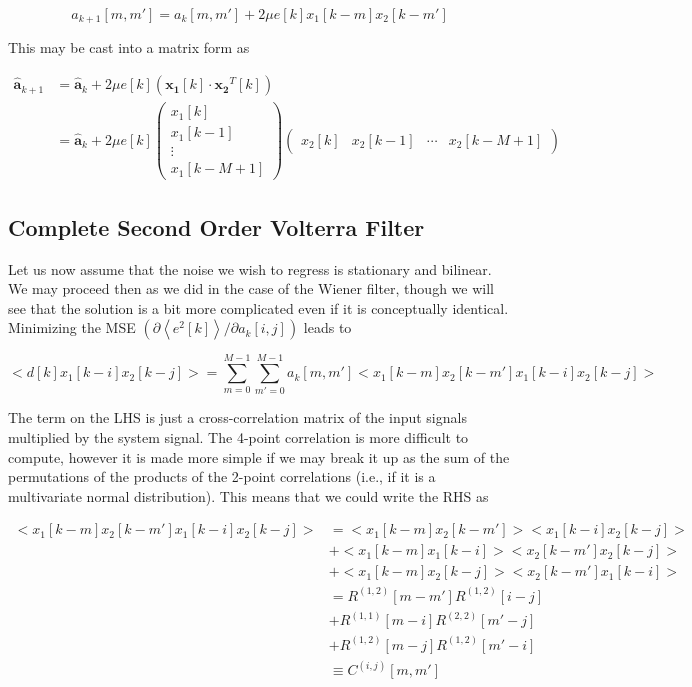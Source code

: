 \documentclass{article}
\begin{document}
\begin{equation}
     a_{k+1}[m, m'] = a_k[m, m'] + 2\mu e[k]
     x_1[k-m]x_2[k-m']
\end{equation}

This may be cast into a matrix form as

\begin{align}
    \mathbf{\hat{a}}_{k+1} &= \mathbf{\hat{a}}_k + 2\mu e[k] (\mathbf{x_1}[k]
    \cdot \mathbf{x_2}^T[k])\\
    &= \hat{\mathbf{a}}_k + 2\mu e[k]
    \begin{pmatrix}
        x_1[k]\\
        x_1[k-1]\\
        \vdots\\
        x_1[k-M+1]
    \end{pmatrix}
    \begin{pmatrix}
        x_2[k] & x_2[k-1] & \cdots & x_2[k-M+1]
    \end{pmatrix}
\end{align}

\subsection{Complete Second Order Volterra Filter}
Let us now assume that the noise we wish to regress is stationary and bilinear.
We may proceed then as we did in the case of the Wiener filter, though we will 
see that the solution is a bit more complicated even if it is conceptually
identical. Minimizing the MSE $(\partial \left<e^2[k]\right>/\partial a_k[i,j])$
leads to

\begin{equation}
    \bigg<d[k]x_1[k-i]x_2[k-j]\bigg> = \sum_{m=0}^{M-1}\sum_{m'=0}^{M-1}a_k[m,m']
    \bigg<x_1[k-m]x_2[k-m'] x_1[k-i]x_2[k-j]\bigg>
\end{equation}

The term on the LHS is just a cross-correlation matrix of the input signals
multiplied by the system signal. The 4-point correlation is more difficult to
compute, however it is made more simple if we may break it up as the sum of
the permutations of the products of the 2-point correlations (i.e., if it is a
multivariate normal distribution). This means that we could write the RHS as

{\small
\begin{align}
    \bigg<x_1[k-m]x_2[k-m'] x_1[k-i]x_2[k-j]\bigg> &= \bigg<x_1[k-m]x_2[k-m']\bigg>
    \bigg<x_1[k-i]x_2[k-j]\bigg>\nonumber\\
    &+ \bigg<x_1[k-m]x_1[k-i]\bigg>\bigg<x_2[k-m']x_2[k-j]\bigg>\nonumber\\
    &+ \bigg<x_1[k-m]x_2[k-j]\bigg>\bigg<x_2[k-m']x_1[k-i]\bigg>\nonumber\\
    &= R^{(1,2)}[m-m']R^{(1,2)}[i-j]\nonumber\\
    &+ R^{(1,1)}[m-i]R^{(2,2)}[m'-j]\nonumber\\
    &+ R^{(1,2)}[m-j]R^{(1,2)}[m'-i]\nonumber\\
    &\equiv C^{(i,j)}[m,m']
\end{align}
}
\end{document}
